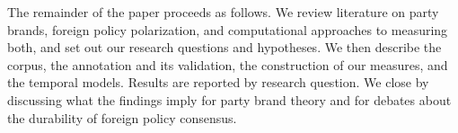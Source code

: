 The remainder of the paper proceeds as follows. We review literature on party brands, foreign policy polarization, and computational approaches to measuring both, and set out our research questions and hypotheses. We then describe the corpus, the annotation and its validation, the construction of our measures, and the temporal models. Results are reported by research question. We close by discussing what the findings imply for party brand theory and for debates about the durability of foreign policy consensus.

